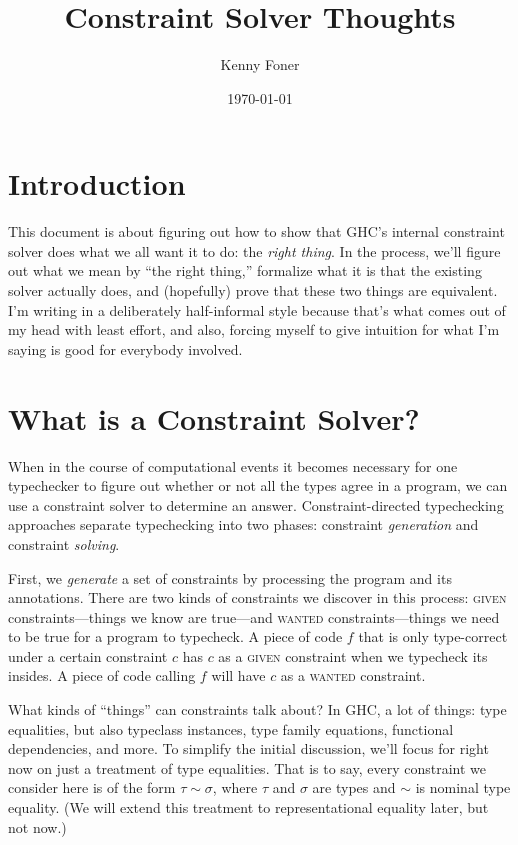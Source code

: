 \documentclass[10pt, letterpaper, oneside]{article}
\title{Constraint Solver Thoughts}
\author{Kenny Foner}
\date{\today}
\begin{document}
\maketitle

\section{Introduction}

This document is about figuring out how to show that GHC's internal constraint solver does what we all want it to do: the \emph{right thing}. In the process, we'll figure out what we mean by ``the right thing,'' formalize what it is that the existing solver actually does, and (hopefully) prove that these two things are equivalent. I'm writing in a deliberately half-informal style because that's what comes out of my head with least effort, and also, forcing myself to give intuition for what I'm saying is good for everybody involved.

\section{What is a Constraint Solver?}

When in the course of computational events it becomes necessary for one typechecker to figure out whether or not all the types agree in a program, we can use a constraint solver to determine an answer. Constraint-directed typechecking approaches separate typechecking into two phases: constraint \emph{generation} and constraint \emph{solving}.

First, we \emph{generate} a set of constraints by processing the program and its annotations. There are two kinds of constraints we discover in this process: \textsc{given} constraints---things we know are true---and \textsc{wanted} constraints---things we need to be true for a program to typecheck. A piece of code \(f\) that is only type-correct under a certain constraint \(c\) has \(c\) as a \textsc{given} constraint when we typecheck its insides. A piece of code calling \(f\) will have \(c\) as a \textsc{wanted} constraint.

What kinds of ``things'' can constraints talk about? In GHC, a lot of things: type equalities, but also typeclass instances, type family equations, functional dependencies, and more. To simplify the initial discussion, we'll focus for right now on just a treatment of type equalities. That is to say, every constraint we consider here is of the form \(\tau \sim \sigma\), where \(\tau\) and \(\sigma\) are types and \(\sim\) is nominal type equality. (We will extend this treatment to representational equality later, but not now.)
\end{document}
